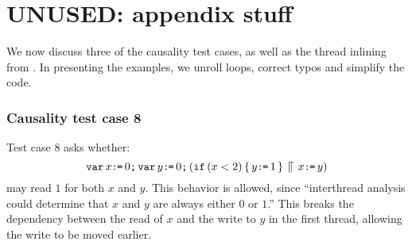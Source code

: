 \documentclass[conference]{IEEEtran}
\theoremstyle{plain}
\theoremstyle{definition}
\begin{document}


\section{UNUSED: appendix stuff}

We now discuss three of the causality test cases, as well as the thread
inlining from \cite{Manson:2005:JMM:1047659.1040336}.  In presenting the
examples, we unroll loops, correct typos and simplify the code.  

\subsubsection{Causality test case 8}

Test case 8 asks whether:
\begin{displaymath}
  \texttt{var}\, x\texttt{:}\mkern-1mu\texttt{=}\, 0\texttt{;}\,
  \texttt{var}\, y\texttt{:}\mkern-1mu\texttt{=}\, 0\texttt{;}\,
  (\texttt{if}\,(x<2)\,\{\, y\texttt{:}\mkern-1mu\texttt{=}\, 1\,\} 
  \,\mathbin{\llceil}\,
  x\texttt{:}\mkern-1mu\texttt{=}\, y)
\end{displaymath}
may read $1$ for both $x$ and $y$.  This behavior is allowed, since
``interthread analysis could determine that $x$ and $y$ are always either $0$
or $1$.''  This breaks the dependency between the read of $x$ and the write
to $y$ in the first thread, allowing the write to be moved earlier.
\end{document}
